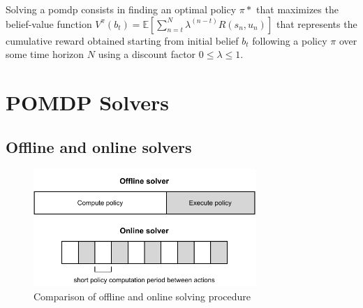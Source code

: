 Solving a \gls{pomdp} consists in finding an optimal policy $\pi*$ that maximizes the belief-value function $V^\pi(b_t) = \mathbb{E}[\sum_{n=t}^{N}\lambda^{(n-t)}R(s_n,u_n)]$ that represents the cumulative reward obtained starting from initial belief $b_t$ following a policy $\pi$ over some time horizon $N$ using a discount factor $0 \leq \lambda \leq 1$.


\section{POMDP Solvers}

\subsection{Offline and online solvers}




\begin{figure}[htbp]
    \centering
    \includegraphics[width=0.75\textwidth]{figures/online-offline.pdf}
    \caption{Comparison of offline and online solving procedure}
\end{figure}

